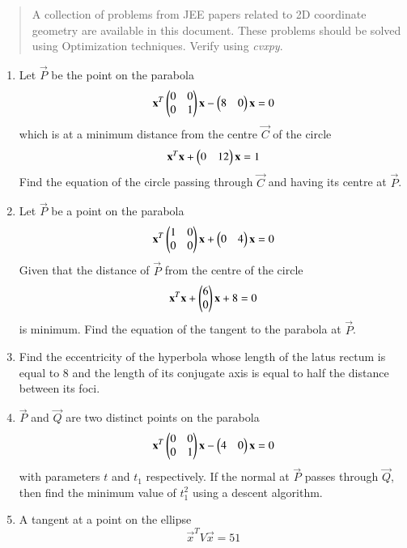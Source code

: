 \documentclass[journal,12pt,twocolumn]{IEEEtran}
\begin{document}
\begin{abstract}
	A  collection of problems from JEE papers related to 2D coordinate geometry are 
available in this document.  These problems should be solved using Optimization techniques. Verify using {\em cvxpy}.
\end{abstract}
\begin{enumerate}[label=\arabic*.]
\item Let $\vec{P}$ be the point on the parabola
\begin{equation}
\label{eq:parab_circ_parab}
\mathbf{x}^T\begin{pmatrix}0 & 0 \\ 0 & 1\end{pmatrix}\mathbf{x} -\begin{pmatrix}8 & 0 \end{pmatrix}\mathbf{x} 
 = 0
\end{equation}
which is at a minimum distance from the centre $\vec{C}$ of the circle
\begin{equation}
\label{eq:parab_circ_circ}
\mathbf{x}^T\mathbf{x} +\begin{pmatrix}0 & 12 \end{pmatrix}\mathbf{x} 
 = 1 
\end{equation} 
Find the equation of the circle passing through $\vec{C}$ and having its centre at $\vec{P}$. 
\item Let $\vec{P}$ 
be a point on the parabola
\begin{equation}
\mathbf{x}^T\begin{pmatrix}1 & 0 \\ 0 & 0\end{pmatrix}\mathbf{x} +\begin{pmatrix}0 & 4 \end{pmatrix}\mathbf{x} 
 = 0
\end{equation}
Given that the distance of $\vec{P}$ from the centre of the circle
\begin{equation}
\mathbf{x}^T\mathbf{x} +\begin{pmatrix}6 \\ 0 \end{pmatrix}\mathbf{x} + 8 = 0
\end{equation}
%
is minimum.  Find the equation of the tangent to the parabola at $\vec{P}$.
\item Find the eccentricity of the hyperbola whose length of the latus rectum is equal to 8 and the length of 
its conjugate axis is equal to half the distance between its foci. 
\item $\vec{P}$ and $\vec{Q}$ are two distinct points on the parabola
\begin{equation}
\mathbf{x}^T\begin{pmatrix}0 & 0 \\ 0 & 1\end{pmatrix}\mathbf{x} -\begin{pmatrix}4 & 0 \end{pmatrix}\mathbf{x} 
 = 0
\end{equation}
with parameters $t$ and $t_1$ respectively.  If the normal at $\vec{P} $ passes through $\vec{Q}$, then find 
the minimum value of $t_1^2$ using a descent algorithm.
\item A tangent at a point on the ellipse 
\begin{equation}
\vec{x}^TV\vec{x} =51

\end{equation}
\end{enumerate}
\end{document}
